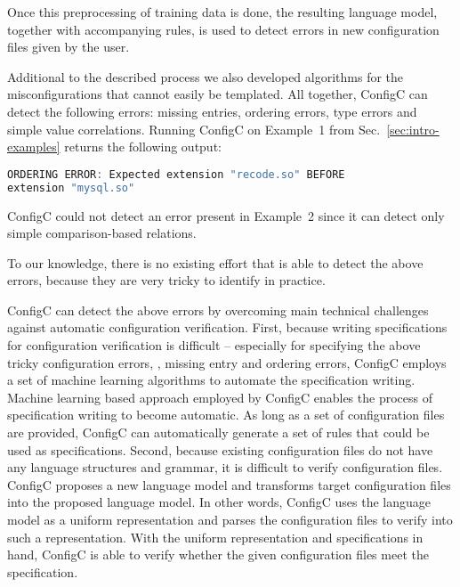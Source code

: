 Once this preprocessing of training data is done, the resulting language model, 
together with accompanying rules, 
is used to detect errors in new configuration files given by the user.

Additional to the described process we also developed algorithms for the 
misconfigurations that cannot easily be templated. All together, ConfigC 
can detect the following errors:
missing entries, ordering errors, type errors and
simple value correlations. Running ConfigC on Example~1 from 
Sec.~\ref{sec:intro-examples} returns the following output:
\begin{lstlisting}[language=C, xleftmargin=.01\textwidth]
ORDERING ERROR: Expected extension "recode.so" BEFORE 
extension "mysql.so"
\end{lstlisting} 
ConfigC could not detect an error present in Example~2 since it can detect 
only simple comparison-based relations.


To our knowledge, there is no existing effort that is able to detect
the above errors, because they are very tricky to identify in
practice.

ConfigC can detect the above errors by overcoming 
main technical challenges against automatic configuration verification.
First, because writing specifications for configuration verification
is difficult -- especially for specifying the above
tricky configuration errors, \eg, missing entry and ordering errors,
ConfigC employs a set of machine learning algorithms to
automate the specification writing. Machine learning based approach
employed by ConfigC enables the process of specification writing to become
automatic. As long as a set of configuration files are provided,
ConfigC can automatically generate a set of rules that could be used
as specifications.
Second, because existing configuration files do not have any language
structures and grammar, it is difficult to verify configuration files.
ConfigC proposes a new language model and transforms target configuration
files into the proposed language model. In other words, ConfigC uses
the language model as a uniform representation and parses the 
configuration files to verify into such a representation.
With the uniform representation and specifications in hand,
ConfigC is able to verify whether the given configuration files
meet the specification.

